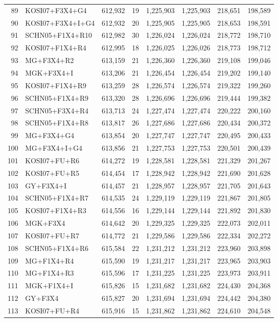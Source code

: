 \begin{longtable}{rlrrrrrr}
89&KOSI07+F3X4+G4&612,932&19&1,225,903&1,225,903&218,651&198,589\\
90&KOSI07+F3X4+I+G4&612,932&20&1,225,905&1,225,905&218,653&198,591\\
91&SCHN05+F1X4+R10&612,982&30&1,226,024&1,226,024&218,772&198,710\\
92&KOSI07+F1X4+R4&612,995&18&1,226,025&1,226,026&218,773&198,712\\
93&MG+F3X4+R2&613,159&21&1,226,360&1,226,360&219,108&199,046\\
94&MGK+F3X4+I&613,206&21&1,226,454&1,226,454&219,202&199,140\\
95&KOSI07+F1X4+R9&613,259&28&1,226,574&1,226,574&219,322&199,260\\
96&SCHN05+F1X4+R9&613,320&28&1,226,696&1,226,696&219,444&199,382\\
97&SCHN05+F3X4+R4&613,713&24&1,227,474&1,227,474&220,222&200,160\\
98&SCHN05+F1X4+R8&613,817&26&1,227,686&1,227,686&220,434&200,372\\
99&MG+F3X4+G4&613,854&20&1,227,747&1,227,747&220,495&200,433\\
100&MG+F3X4+I+G4&613,856&21&1,227,753&1,227,753&220,501&200,439\\
101&KOSI07+FU+R6&614,272&19&1,228,581&1,228,581&221,329&201,267\\
102&KOSI07+FU+R5&614,454&17&1,228,942&1,228,942&221,690&201,628\\
103&GY+F3X4+I&614,457&21&1,228,957&1,228,957&221,705&201,643\\
104&SCHN05+F1X4+R7&614,535&24&1,229,119&1,229,119&221,867&201,805\\
105&KOSI07+F1X4+R3&614,556&16&1,229,144&1,229,144&221,892&201,830\\
106&MGK+F3X4&614,642&20&1,229,325&1,229,325&222,073&202,011\\
107&KOSI07+FU+R7&614,772&21&1,229,586&1,229,586&222,334&202,272\\
108&SCHN05+F1X4+R6&615,584&22&1,231,212&1,231,212&223,960&203,898\\
109&MG+F1X4+R4&615,590&19&1,231,217&1,231,217&223,965&203,903\\
110&MG+F1X4+R3&615,596&17&1,231,225&1,231,225&223,973&203,911\\
111&MGK+F1X4+I&615,826&15&1,231,682&1,231,682&224,430&204,368\\
112&GY+F3X4&615,827&20&1,231,694&1,231,694&224,442&204,380\\
113&KOSI07+FU+R4&615,916&15&1,231,862&1,231,862&224,610&204,548\\

\end{longtable}
